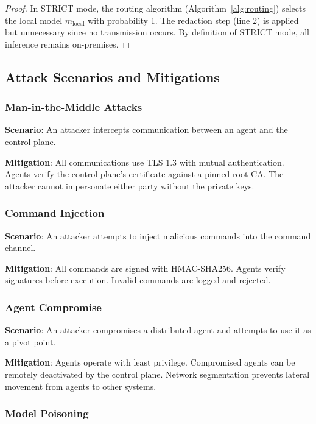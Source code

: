 \begin{proof}
In STRICT mode, the routing algorithm (Algorithm~\ref{alg:routing}) selects the local model $m_{\text{local}}$ with probability 1. The redaction step (line 2) is applied but unnecessary since no transmission occurs. By definition of STRICT mode, all inference remains on-premises.
\end{proof}

\subsection{Attack Scenarios and Mitigations}
\label{subsec:attacks}

\subsubsection{Man-in-the-Middle Attacks}

\textbf{Scenario}: An attacker intercepts communication between an agent and the control plane.

\textbf{Mitigation}: All communications use TLS 1.3 with mutual authentication. Agents verify the control plane's certificate against a pinned root CA. The attacker cannot impersonate either party without the private keys.

\subsubsection{Command Injection}

\textbf{Scenario}: An attacker attempts to inject malicious commands into the command channel.

\textbf{Mitigation}: All commands are signed with HMAC-SHA256. Agents verify signatures before execution. Invalid commands are logged and rejected.

\subsubsection{Agent Compromise}

\textbf{Scenario}: An attacker compromises a distributed agent and attempts to use it as a pivot point.

\textbf{Mitigation}: Agents operate with least privilege. Compromised agents can be remotely deactivated by the control plane. Network segmentation prevents lateral movement from agents to other systems.

\subsubsection{Model Poisoning}

